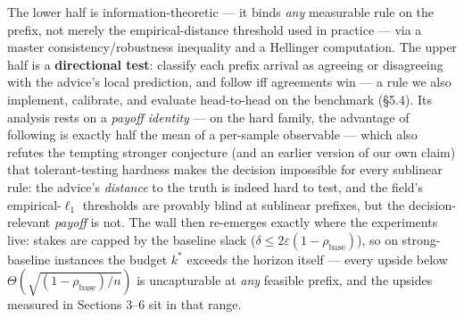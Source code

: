 The lower half is information-theoretic --- it binds \emph{any}
measurable rule on the prefix, not merely the empirical-distance
threshold used in practice --- via a master consistency/robustness
inequality and a Hellinger computation. The upper half is a
\textbf{directional test}: classify each prefix arrival as agreeing or
disagreeing with the advice's local prediction, and follow iff
agreements win --- a rule we also implement, calibrate, and evaluate
head-to-head on the benchmark (§5.4). Its analysis rests on a
\emph{payoff identity} --- on the hard family, the advantage of
following is exactly half the mean of a per-sample observable --- which
also refutes the tempting stronger conjecture (and an earlier version of
our own claim) that tolerant-testing hardness
\cite{canonne2022tolerance} makes the decision impossible for every
sublinear rule: the advice's \emph{distance} to the truth is indeed hard
to test, and the field's empirical-\(\ell_1\) thresholds are provably
blind at sublinear prefixes, but the decision-relevant \emph{payoff} is
not. The wall then re-emerges exactly where the experiments live: stakes
are capped by the baseline slack
(\(\delta \le 2\varepsilon(1-\rho_{\mathrm{base}})\)), so on
strong-baseline instances the budget \(k^*\) exceeds the horizon itself
--- every upside below \(\Theta(\sqrt{(1-\rho_{\mathrm{base}})/n})\) is
uncapturable at \emph{any} feasible prefix, and the upsides measured in
Sections 3--6 sit in that range.

